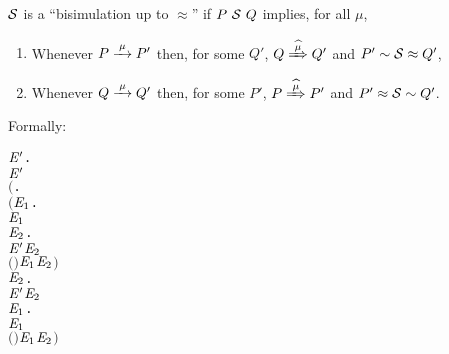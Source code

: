 \begin{definition}%
  \label{def:singleweak}
  $\S$ is a ``bisimulation up to $\approx$'' if
  $P\ \S\ Q$ implies, for all $\mu$,
\begin{enumerate}
\item Whenever $P \arr{\mu} P'$ then, for some
  $Q'$, $Q \Arcap{\mu} Q'$ and $P' \sim \S \approx Q'$,
\item Whenever $Q \arr{\mu} Q'$ then, for some
  $P'$, $P \Arcap{\mu} P'$ and $P' \approx \S \sim Q'$.
\end{enumerate}
Formally:
\begin{alltt}
     \HOLTokenDefEquality{}
     \HOLSymConst{\HOLTokenForall{}} \ensuremath{\HOLBoundVar{E}\sp{\prime}}.
           \ensuremath{\HOLBoundVar{E}\sp{\prime}} \HOLSymConst{\HOLTokenImp{}}
         \ensuremath{(}\HOLSymConst{\HOLTokenForall{}}.
              \ensuremath{(}\HOLSymConst{\HOLTokenForall{}}\ensuremath{\HOLBoundVar{E}\sb{\mathrm{1}}}.
                    \HOLTokenTransBegin{} \HOLTokenTransEnd \ensuremath{\HOLBoundVar{E}\sb{\mathrm{1}}} \HOLSymConst{\HOLTokenImp{}}
                   \HOLSymConst{\HOLTokenExists{}}\ensuremath{\HOLBoundVar{E}\sb{\mathrm{2}}}.
                       \ensuremath{\HOLBoundVar{E}\sp{\prime}} \HOLTokenWeakTransBegin{} \HOLTokenWeakTransEnd \ensuremath{\HOLBoundVar{E}\sb{\mathrm{2}}} \HOLSymConst{\HOLTokenConj{}}
                       \ensuremath{(} \HOLSymConst{\HOLTokenRCompose{}}  \HOLSymConst{\HOLTokenRCompose{}} \ensuremath{)} \ensuremath{\HOLBoundVar{E}\sb{\mathrm{1}}} \ensuremath{\HOLBoundVar{E}\sb{\mathrm{2}}}\ensuremath{)} \HOLSymConst{\HOLTokenConj{}}
              \HOLSymConst{\HOLTokenForall{}}\ensuremath{\HOLBoundVar{E}\sb{\mathrm{2}}}.
                  \ensuremath{\HOLBoundVar{E}\sp{\prime}} \HOLTokenTransBegin{} \HOLTokenTransEnd \ensuremath{\HOLBoundVar{E}\sb{\mathrm{2}}} \HOLSymConst{\HOLTokenImp{}}
                  \HOLSymConst{\HOLTokenExists{}}\ensuremath{\HOLBoundVar{E}\sb{\mathrm{1}}}.
                       \HOLTokenWeakTransBegin{} \HOLTokenWeakTransEnd \ensuremath{\HOLBoundVar{E}\sb{\mathrm{1}}} \HOLSymConst{\HOLTokenConj{}}
                      \ensuremath{(} \HOLSymConst{\HOLTokenRCompose{}}  \HOLSymConst{\HOLTokenRCompose{}} \ensuremath{)} \ensuremath{\HOLBoundVar{E}\sb{\mathrm{1}}} \ensuremath{\HOLBoundVar{E}\sb{\mathrm{2}}}\ensuremath{)} \HOLSymConst{\HOLTokenConj{}}

\end{alltt}
\end{definition}
